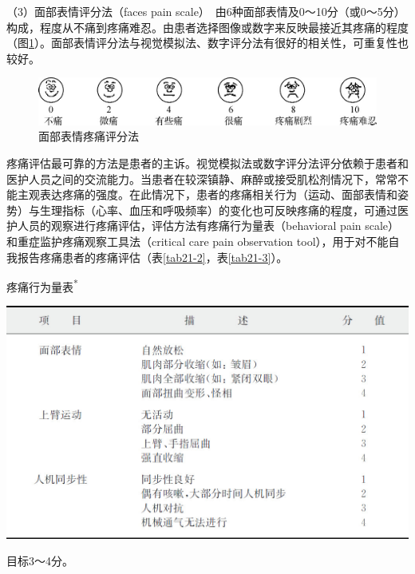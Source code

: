 （3）面部表情评分法（faces pain
scale）　由6种面部表情及0～10分（或0～5分）构成，程度从不痛到疼痛难忍。由患者选择图像或数字来反映最接近其疼痛的程度（图\ref{fig21-3}）。面部表情评分法与视觉模拟法、数字评分法有很好的相关性，可重复性也较好。

\begin{figure}[!htbp]
 \centering
 \includegraphics{./images/Image00229.jpg}
 \captionsetup{justification=centering}
 \caption{面部表情疼痛评分法}
 \label{fig21-3}
  \end{figure} 

疼痛评估最可靠的方法是患者的主诉。视觉模拟法或数字评分法评分依赖于患者和医护人员之间的交流能力。当患者在较深镇静、麻醉或接受肌松剂情况下，常常不能主观表达疼痛的强度。在此情况下，患者的疼痛相关行为（运动、面部表情和姿势）与生理指标（心率、血压和呼吸频率）的变化也可反映疼痛的程度，可通过医护人员的观察进行疼痛评估，评估方法有疼痛行为量表（behavioral
pain scale）和重症监护疼痛观察工具法（critical care pain observation
tool），用于对不能自我报告疼痛患者的疼痛评估（表\ref{tab21-2}，表\ref{tab21-3}）。

\begin{table}[htbp]
{\centering
\caption{疼痛行为量表\textsuperscript{*}}
\label{tab21-2}
\includegraphics{./images/Image00230.jpg}}

\footnotesize * 目标3～4分。
\end{table}



